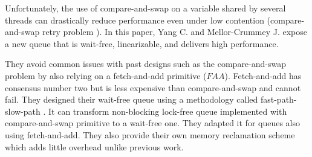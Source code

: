  Unfortunately, the use of compare-and-swap on a variable
shared by several threads can drastically reduce performance even under low
contention (compare-and-swap retry problem
\cite{Morrison:2013:FCQ:2517327.2442527}). In this paper, Yang C. and
Mellor-Crummey J. expose a new queue that is wait-free, linearizable, and
delivers high performance.

They avoid common issues with past designs such as the compare-and-swap problem
by also relying on a fetch-and-add primitive ($FAA$). Fetch-and-add has
consensus number two but is less expensive than compare-and-swap and cannot
fail. They designed their wait-free queue using a methodology called
fast-path-slow-path \cite{Kogan:2012:MCF:2370036.2145835}. It can transform
non-blocking lock-free queue implemented with compare-and-swap primitive to a
wait-free one. They adapted it for queues also using fetch-and-add. They also
provide their own memory reclamation scheme which adds little overhead unlike
previous work.
